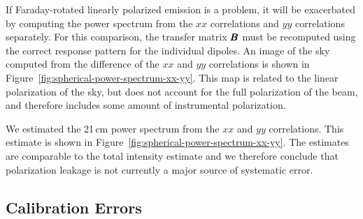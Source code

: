 \begin{bibunit}
If Faraday-rotated linearly polarized emission is a problem, it will be exacerbated by computing the
power spectrum from the $xx$ correlations and $yy$ correlations separately. For this comparison, the
transfer matrix $\pmb B$ must be recomputed using the correct response pattern for the individual
dipoles. An image of the sky computed from the difference of the $xx$ and $yy$ correlations is shown
in Figure~\ref{fig:spherical-power-spectrum-xx-yy}. This map is related to the linear polarization
of the sky, but does not account for the full polarization of the beam, and therefore includes some
amount of instrumental polarization.

We estimated the 21\,cm power spectrum from the $xx$ and $yy$ correlations. This estimate is shown
in Figure~\ref{fig:spherical-power-spectrum-xx-yy}. The estimates are comparable to the total
intensity estimate and we therefore conclude that polarization leakage is not currently a major
source of systematic error.

\subsection{Calibration Errors}\label{sec:calibration-errors}


\end{bibunit}
